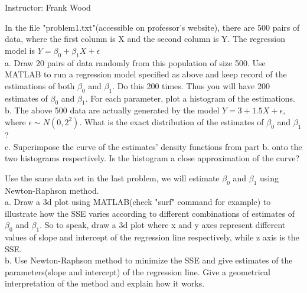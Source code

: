 \documentclass[12pt]{article}
\begin{document}
 \begin{center}
  Instructor: Frank Wood
 \end{center}
{}
\finishfirstpage



 {
 In the file "problem1.txt"(accessible on professor's website),
 there are 500 pairs of data, where the first column is X and
 the second column is Y. The regression model is
 $Y=\beta_0+\beta_1X+\epsilon$\\
 a. Draw 20 pairs of data randomly from this population of size 500.
 Use MATLAB to run a regression model specified as above and keep
 record of the estimations of both $\beta_0$ and $\beta_1$. Do this
 200 times. Thus you will have 200 estimates of $\beta_0$ and $\beta_1$.
 For each parameter, plot a histogram of the estimations.\\
 b. The above 500 data are actually generated by the model
 $Y=3+1.5X+\epsilon$, where $\epsilon\sim N(0,2^2)$. What is the
 exact distribution of the estimates of $\beta_0$ and $\beta_1$?\\
 c. Superimpose the curve of the estimates' density functions from
 part b. onto the two histograms respectively. Is the histogram a
 close approximation of the curve?
   }
 { \vfill
  \answer
} { }

 {
 Use the same data set in the last problem, we will estimate
 $\beta_0$ and $\beta_1$ using Newton-Raphson method.\\
 a. Draw a 3d plot using MATLAB(check "surf" command for example) to
 illustrate how the SSE varies according to different combinations
 of estimates of $\beta_0$ and $\beta_1$. So to speak, draw a 3d
 plot where x and y axes represent different values of slope and
 intercept of the regression line respectively, while z axis is the
 SSE.\\
 b. Use Newton-Raphson method to minimize the SSE and give estimates
 of the parameters(slope and intercept) of the regression line. Give
 a geometrical interpretation of the method and explain how it
 works.
  }
 { \vfill
  \answer
} { }
\end{document}
